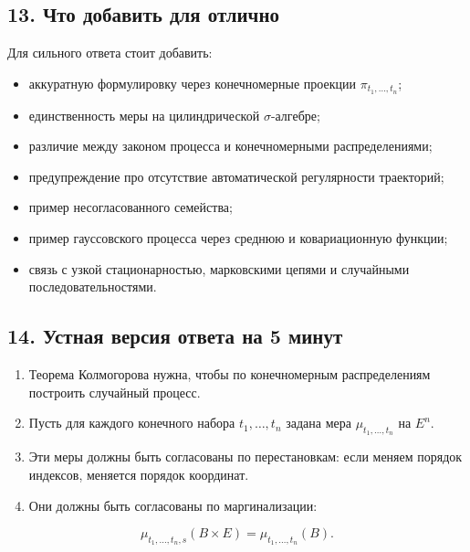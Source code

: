 \documentclass[
  11pt,
  a4paper,
]{article}
\providecommand{\tightlist}{%
  \setlength{\itemsep}{0pt}\setlength{\parskip}{0pt}}
\begin{document}
\subsection{13. Что добавить для
отлично}\label{ux447ux442ux43e-ux434ux43eux431ux430ux432ux438ux442ux44c-ux434ux43bux44f-ux43eux442ux43bux438ux447ux43dux43e}

Для сильного ответа стоит добавить:

\begin{itemize}
\tightlist
\item
  аккуратную формулировку через конечномерные проекции
  \(\pi_{t_1,\ldots,t_n}\);
\item
  единственность меры на цилиндрической \(\sigma\)-алгебре;
\item
  различие между законом процесса и конечномерными распределениями;
\item
  предупреждение про отсутствие автоматической регулярности траекторий;
\item
  пример несогласованного семейства;
\item
  пример гауссовского процесса через среднюю и ковариационную функции;
\item
  связь с узкой стационарностью, марковскими цепями и случайными
  последовательностями.
\end{itemize}

\subsection{14. Устная версия ответа на 5
минут}\label{ux443ux441ux442ux43dux430ux44f-ux432ux435ux440ux441ux438ux44f-ux43eux442ux432ux435ux442ux430-ux43dux430-5-ux43cux438ux43dux443ux442}

\begin{enumerate}
\def\labelenumi{\arabic{enumi}.}
\tightlist
\item
  Теорема Колмогорова нужна, чтобы по конечномерным распределениям
  построить случайный процесс.
\item
  Пусть для каждого конечного набора \(t_1,\ldots,t_n\) задана мера
  \(\mu_{t_1,\ldots,t_n}\) на \(E^n\).
\item
  Эти меры должны быть согласованы по перестановкам: если меняем порядок
  индексов, меняется порядок координат.
\item
  Они должны быть согласованы по маргинализации:
\end{enumerate}

\[
\mu_{t_1,\ldots,t_n,s}(B\times E)
=
\mu_{t_1,\ldots,t_n}(B).
\]
\end{document}
